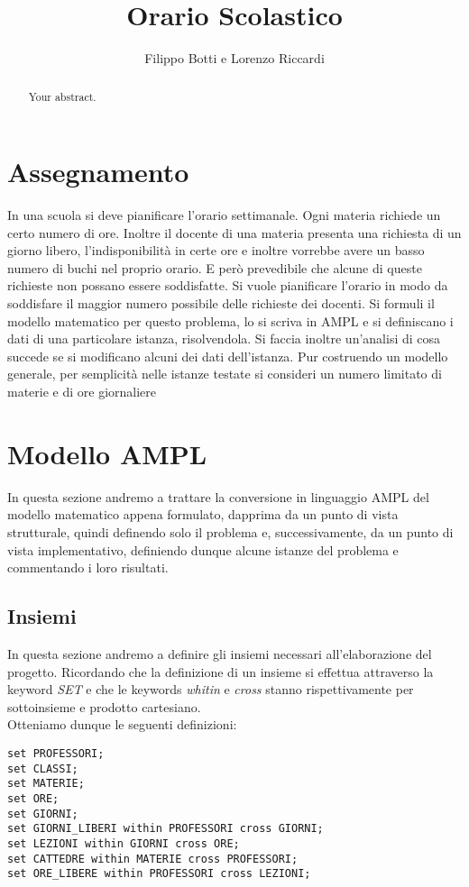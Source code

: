 \documentclass{article}
\title{Orario Scolastico}
\author{Filippo Botti e Lorenzo Riccardi}
\begin{document}
\maketitle

\begin{abstract}
Your abstract.
\end{abstract}

\section{Assegnamento}
In una scuola si deve pianificare l’orario settimanale. Ogni materia richiede un
certo numero di ore. Inoltre il docente di una materia presenta una richiesta di
un giorno libero, l’indisponibilità in certe ore e inoltre vorrebbe avere un basso
numero di buchi nel proprio orario. E però prevedibile che alcune di queste
richieste non possano essere soddisfatte. Si vuole pianificare l’orario in modo da
soddisfare il maggior numero possibile delle richieste dei docenti.
Si formuli il modello matematico per questo problema, lo si scriva in AMPL
e si definiscano i dati di una particolare istanza, risolvendola. Si faccia inoltre
un’analisi di cosa succede se si modificano alcuni dei dati dell’istanza. Pur
costruendo un modello generale, per semplicità nelle istanze testate si consideri
un numero limitato di materie e di ore giornaliere


\section{Modello AMPL}
In questa sezione andremo a trattare la conversione in linguaggio AMPL del modello matematico appena formulato, dapprima da un punto di vista strutturale, quindi definendo solo il problema e, successivamente, da un punto di vista implementativo, definiendo dunque alcune istanze del problema e commentando i loro risultati.
\subsection{Insiemi}
In questa sezione andremo a definire gli insiemi necessari all'elaborazione del progetto. Ricordando che la definizione di un insieme si effettua attraverso la keyword \emph{SET} e che le keywords \emph{whitin} e \emph{cross} stanno rispettivamente per sottoinsieme e prodotto cartesiano. 
\\Otteniamo dunque le seguenti definizioni:
\begin{verbatim}
set PROFESSORI;
set CLASSI;
set MATERIE;
set ORE;
set GIORNI;
set GIORNI_LIBERI within PROFESSORI cross GIORNI;
set LEZIONI within GIORNI cross ORE;
set CATTEDRE within MATERIE cross PROFESSORI;
set ORE_LIBERE within PROFESSORI cross LEZIONI;
\end{verbatim}
\\
\end{document}
